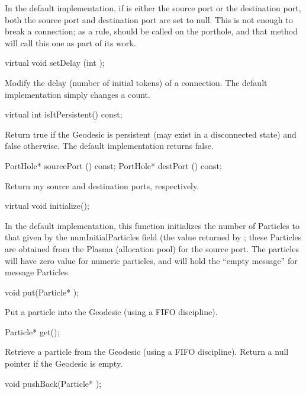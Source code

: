 In the default implementation, if  is either the source port or
the destination port, both the source port and destination port are set
to null.  This is not enough to break a connection; as a rule,
 should be called on the porthole, and that method
will call this one as part of its work.

\begin{example}
virtual void setDelay (int );
\end{example}

Modify the delay (number of initial tokens) of a connection.  The
default implementation simply changes a count.

\begin{example}
virtual int isItPersistent() const;
\end{example}

Return true if the Geodesic is persistent (may exist in a disconnected
state) and false otherwise.  The default implementation returns false.

\begin{example}
PortHole* sourcePort () const;
PortHole* destPort () const;
\end{example}

Return my source and destination ports, respectively.

\begin{example}
virtual void initialize();
\end{example}

In the default implementation, this function initializes the number of
Particles to that given by the numInitialParticles field (the value
returned by ; these Particles are obtained from the
Plasma (allocation pool) for the source port.  The particles will
have zero value for numeric particles, and will hold the ``empty message''
for message Particles.

\begin{example}
void put(Particle* );
\end{example}

Put a particle into the Geodesic (using a FIFO discipline).

\begin{example}
Particle* get();
\end{example}

Retrieve a particle from the Geodesic (using a FIFO discipline).
Return a null pointer if the Geodesic is empty.

\begin{example}
void pushBack(Particle* );
\end{example}

